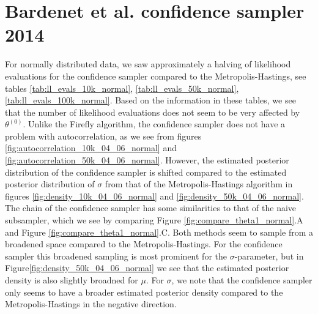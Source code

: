 \section{Bardenet et al. confidence sampler 2014}
For normally distributed data, we saw approximately a halving of likelihood evaluations for the confidence sampler compared to the Metropolis-Hastings, see tables \ref{tab:ll_evals_10k_normal}, \ref{tab:ll_evals_50k_normal}, \ref{tab:ll_evals_100k_normal}.
Based on the information in these tables, we see that the number of likelihood evaluations does not seem to be very affected by $\theta^{\left(0\right)}$. 
Unlike the Firefly algorithm, the confidence sampler does not have a problem with autocorrelation, as we see from figures \ref{fig:autocorrelation_10k_04_06_normal} and \ref{fig:autocorrelation_50k_04_06_normal}. 
However, the estimated posterior distribution of the confidence sampler is shifted compared to the estimated posterior distribution of $\sigma$ from that of the Metropolis-Hastings algorithm in figures \ref{fig:density_10k_04_06_normal} and \ref{fig:density_50k_04_06_normal}. The chain of the confidence sampler has some similarities to that of the naive subsampler, which we see by 
comparing Figure \ref{fig:compare_theta1_normal}.A and Figure \ref{fig:compare_theta1_normal}.C. 
Both methods seem to sample from a broadened space compared to the Metropolis-Hastings. For the confidence sampler this broadened sampling is most prominent for the $\sigma$-parameter, but in Figure\ref{fig:density_50k_04_06_normal} we see that the estimated posterior density is also slightly broadned for $\mu$. For $\sigma$,  we note that the confidence sampler only seems to have a broader estimated posterior density compared to the Metropolis-Hastings in the negative direction.     

